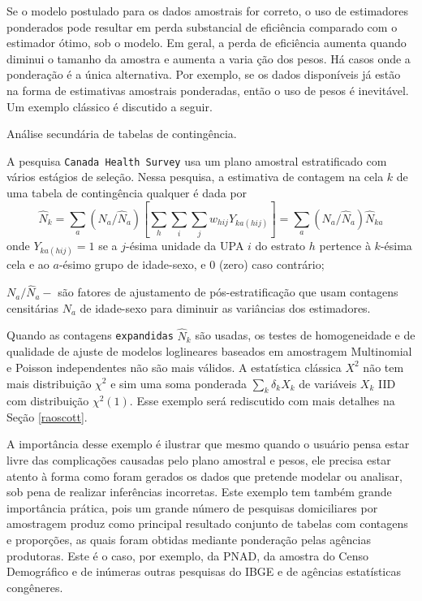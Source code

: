 \documentclass[]{book}
\numberwithin{example}{chapter}
\numberwithin{remark}{chapter}
\numberwithin{definition}{chapter}
\let\BeginKnitrBlock\begin \let\EndKnitrBlock\end
\begin{document}
Se o modelo postulado para os dados amostrais for correto, o uso de
estimadores ponderados pode resultar em perda substancial de eficiência
comparado com o estimador ótimo, sob o modelo. Em geral, a perda de
eficiência aumenta quando diminui o tamanho da amostra e aumenta a varia
ção dos pesos. Há casos onde a ponderação é a única alternativa. Por
exemplo, se os dados disponíveis já estão na forma de estimativas
amostrais ponderadas, então o uso de pesos é inevitável. Um exemplo
clássico é discutido a seguir.

\BeginKnitrBlock{example}
\protect\hypertarget{ex:Analisec}{}{\label{ex:Analisec}}Análise secundária
de tabelas de contingência.
\EndKnitrBlock{example}

A pesquisa \texttt{Canada\ Health\ Survey} usa um plano amostral
estratificado com vários estágios de seleção. Nessa pesquisa, a
estimativa de contagem na cela \(k\) de uma tabela de contingência
qualquer é dada por \[
\widehat{N}_{k}=\sum_{a}\left( N_{a}/\widehat{N}_{a}\right) \left[
\sum_{h}\sum_{i}\sum_{j}w_{hij}Y_{ka\left( hij\right) }\right]
=\sum_{a}\left( N_{a}/\widehat{N}_{a}\right) \widehat{N}_{ka} 
\] onde \(Y_{ka\left( hij\right)}=1\) se a \(j\)-ésima unidade da UPA
\(i\) do estrato \(h\) pertence à \(k\)-ésima cela e ao \(a\)-ésimo
grupo de idade-sexo, e \(0\) (zero) caso contrário;

\(N_{a}/\widehat{N}_{a}-\) são fatores de ajustamento de
pós-estratificação que usam contagens censitárias \(N_{a}\) de
idade-sexo para diminuir as variâncias dos estimadores.

Quando as contagens \texttt{expandidas} \(\widehat{N}_{k}\) são usadas,
os testes de homogeneidade e de qualidade de ajuste de modelos
loglineares baseados em amostragem Multinomial e Poisson independentes
não são mais válidos. A estatística clássica \(X^{2}\) não tem mais
distribuição \(\chi ^{2}\) e sim uma soma ponderada
\(\sum_{k}\delta _{k}X_{k}\) de variáveis \(X_{k}\) IID com distribuição
\(\chi ^{2}\left( 1\right)\). Esse exemplo será rediscutido com mais
detalhes na Seção \ref{raoscott}.

A importância desse exemplo é ilustrar que mesmo quando o usuário pensa
estar livre das complicações causadas pelo plano amostral e pesos, ele
precisa estar atento à forma como foram gerados os dados que pretende
modelar ou analisar, sob pena de realizar inferências incorretas. Este
exemplo tem também grande importância prática, pois um grande número de
pesquisas domiciliares por amostragem produz como principal resultado
conjunto de tabelas com contagens e proporções, as quais foram obtidas
mediante ponderação pelas agências produtoras. Este é o caso, por
exemplo, da PNAD, da amostra do Censo Demográfico e de inúmeras outras
pesquisas do IBGE e de agências estatísticas congêneres.
\end{document}
